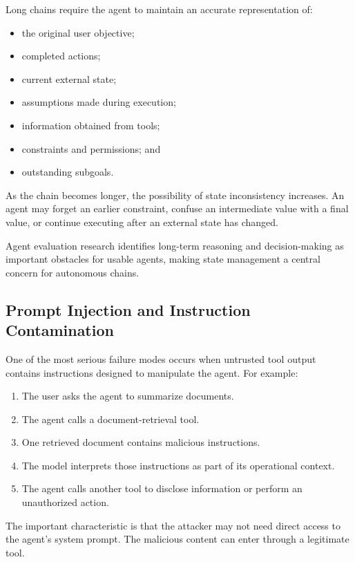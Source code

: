 \documentclass[11pt]{article}
\begin{document}
Long chains require the agent to maintain an accurate representation of:
\begin{itemize}[noitemsep]
    \item the original user objective;
    \item completed actions;
    \item current external state;
    \item assumptions made during execution;
    \item information obtained from tools;
    \item constraints and permissions; and
    \item outstanding subgoals.
\end{itemize}

As the chain becomes longer, the possibility of state inconsistency increases. An
agent may forget an earlier constraint, confuse an intermediate value with a final
value, or continue executing after an external state has changed.

Agent evaluation research identifies long-term reasoning and decision-making as
important obstacles for usable agents, making state management a central
concern for autonomous chains.

\subsection{Prompt Injection and Instruction Contamination}

One of the most serious failure modes occurs when untrusted tool output contains
instructions designed to manipulate the agent. For example:
\begin{enumerate}[noitemsep]
    \item The user asks the agent to summarize documents.
    \item The agent calls a document-retrieval tool.
    \item One retrieved document contains malicious instructions.
    \item The model interprets those instructions as part of its operational context.
    \item The agent calls another tool to disclose information or perform an unauthorized action.
\end{enumerate}

The important characteristic is that the attacker may not need direct access to the
agent's system prompt. The malicious content can enter through a legitimate tool.
\end{document}
